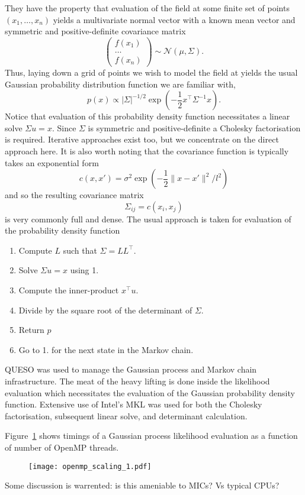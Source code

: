 They have the property that evaluation of the field at some finite set of
points $(x_1, \ldots, x_n)$ yields a multivariate normal vector with a known
mean vector and symmetric and positive-definite covariance matrix
\begin{equation}
  \begin{pmatrix}
    f(x_1) \\
    \hdots \\
    f(x_n)
  \end{pmatrix}
  \sim \mathcal{N}(\mu, \Sigma).
\end{equation}
Thus, laying down a grid of points we wish to model the field at yields the
usual Gaussian probability distribution function we are familiar with,
\begin{equation}
  p(x) \propto |\Sigma|^{-1/2} \exp(-\frac12 x^\top \Sigma^{-1} x).
\end{equation}
Notice that evaluation of this probability density function necessitates a
linear solve $\Sigma u = x$.  Since $\Sigma$ is symmetric and positive-definite
a Cholesky factorisation is required.  Iterative approaches exist too, but we
concentrate on the direct approach here.  It is also worth noting that the
covariance function is typically takes an exponential form
\begin{equation}
  c(x, x') = \sigma^2 \exp(-\frac12 \| x - x' \|^2 / l^2)
\end{equation}
and so the resulting covariance matrix
\begin{equation}
  \Sigma_{ij} = c(x_i, x_j)
\end{equation}
is very commonly full and dense.  The usual approach is taken for evaluation
of the probability density function
\begin{enumerate}
  \item Compute $L$ such that $\Sigma = LL^\top$.
  \item Solve $\Sigma u = x$ using 1.
  \item Compute the inner-product $x^\top u$.
  \item Divide by the square root of the determinant of $\Sigma$.
  \item Return $p$
  \item Go to 1. for the next state in the Markov chain.
\end{enumerate}

QUESO was used to manage the Gaussian process and Markov chain infrastructure.
The meat of the heavy lifting is done inside the likelihood evaluation which
necessitates the evaluation of the Gaussian probability density function.
Extensive use of Intel's MKL was used for both the Cholesky factorisation,
subsequent linear solve, and determinant calculation.

Figure~\ref{fig:gp} shows timings of a Gaussian process likelihood evaluation
as a function of number of OpenMP threads.

\begin{figure}
  \texttt{[image: openmp\_scaling\_1.pdf]}
  \label{fig:gp}
\end{figure}

Some discussion is warrented: is this ameniable to MICs? Vs typical CPUs?
